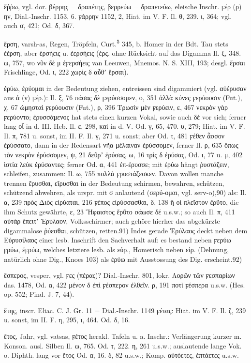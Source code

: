 ἔῤῥω, vgl. dor. βέρρης = δραπέτης, βερρεύω = δραπετεύω, eleische Inschr. ϝέρ (ρ) ην, Dial.-Inschr. 1153, 6. ϝάρρην 1152, 2, Hiat. im V. F. Il. θ, 239. ι, 364; vgl. auch σ, 421; Od. δ, 367.

ἕρση,  varsh-as, Regen, Tröpfeln, Curt.\textsuperscript{5} 345, b. Homer in der Bdt. Tau stets ἐέρση, aber ἑρσήεις u. ἐερσήεις (ἑρς. ohne Rücksicht auf das Digamma Il. ξ, 348. ω, 757, wo νῦν δέ μ ἐϝερσήεις van Leeuwen, Mnemos. N. S. XIII, 193; desgl. ἕρσαι Frischlinge, Od. ι, 222 χωρὶς δ αὖθʼ ἕρσαι).

ἐρύω, ἐρύομαι in der Bedeutung ziehen, entreissen sind digammiert (vgl. αὐέρυσαν aus ἀ (ν) ϝέρ.): Il. ξ, 76 πάσας δὲ ϝερύσσομεν, ο, 351 ἀλλὰ κύνες ϝερύουσιν (Fut.), χ, 67 ὠμησταὶ ϝερύουσιν (Fut.), ρ, 396 Τρωσὶν μὲν ϝερύειν, ε, 467 νεκρὸν γὰρ ϝερύοντο; ἐρυσσάμενος hat stets einen kurzen Vokal, sowie auch δέ vor sich; ferner lang οἷ in d. III. Heb. Il. ε, 298, καί in d. V. Od. γ, 65, 470. υ, 279; Hiat. im V. F. Il. π, 781 u. sonst, im II. F. Il. γ, 271 u. sonst; aber Od. τ, 481 ϝέθεν ἆσσον ἐρύσσατο, dann in der Redensart νῆα μέλαιναν ἐρύσσομεν, ferner Il. ρ, 635 ὅπως τὸν νεκρὸν ἐρύσσομεν, ψ, 21 δεῦρʼ ἐρύσας, ω, 16 τρὶς δ ἐρύσας, Od. ι, 77 u. μ, 402 ἱστία λεύκ ἐρύσαντες; ferner Od. α, 441 ἐπ-έρυσσε; mit ἐρύω hängt ῥυστάζειν, schleifen, zusammen: Il. ω, 755 πολλὰ ϝρυστάζεσκεν. Davon wollen manche trennen ἔρυσθαι, εἴρυσθαι in der Bedeutung schirmen, bewahren, schützen, schützend abwehren, als urspr. mit σ anlautend (σερύ-ομαι, vgl. serv-o),90) als: Il. α, 239 πρὸς Διὸς εἰρύαται, 216 ϝέπος εἰρύσσασθαι, δ, 138 ἥ οἱ πλεῖστον ἔρῦτο, die ihm Schutz gewährte, ε, 23 Ἥφαιστος ἔρῦτο σάωσε δέ u.s.w.; so auch Il. π, 411 αὐτὰρ ἔπειτʼ Ἐρύλαον, Volksschirmer; auch gehöre hierher das abgekürzte digammalose ῥύεσθαι, schützen, retten.91) Indes gerade Ἐρύλαος deckt neben dem Εὐρυσίλαος einer lesb. Inschrift den Sachverhalt auf: es bestand neben ϝερύω ϝρύω, ἐϝρύω, welches letztere lesb. als εὐρ., Homerisch neben εἰρ. (Dehnung, natürlich ohne Dig., Knoes 103) als ἐρύω mit Ausstossung des Dig. erscheint.92)

ἕσπερος, vesper, vgl.  ϝες (πέρας)? Dial.-Inschr. 801, lokr. Λορῶν τῶν ϝεσπαρίων das. 1478, Od. α, 422 μένον δ ἐπὶ ϝέσπερον ἐλθεῖν. ρ, 191 ποτὶ ϝέσπερα u.s.w. (Hes. op. 552; Pind. J. 7, 44).

ἔτης, inscr. Eliac. C. J. Gr. 11 = Dial.-Inschr. 1149 ϝέτας: Hiat. im V. F. Il. ζ, 239 u. sonst, im II. F. η, 295, ι, 464. Od. δ, 16.

ἔτος, Jahr, vgl.  vatsas, ϝέτος herakl. Tafeln u. a. Inschr.: Verlängerung kurzer m. Konson. ausl. Silben Il. ω, 765. Od. τ, 222. η, 261 u.s.w.; auslautende lange Vok. o. Diphth. lang vor ἔτος Od. α, 16. δ, 82 u.s.w.; Komp. αὐτόετες, ἑπτάετες u.s.w.

